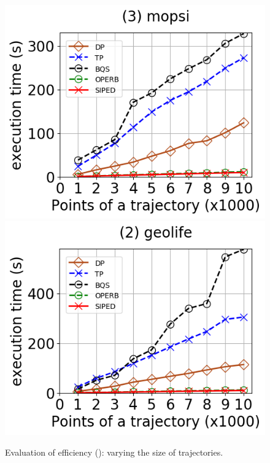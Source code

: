\begin{figure}[tb!]
	\includegraphics[scale=0.315]{Figures/Exp-PED-time-size-mopsi.png}	\hspace{1ex}
	\includegraphics[scale=0.315]{Figures/Exp-PED-time-size-geolife.png}	\hspace{1ex}
	\vspace{-2.5ex}
	\caption{\small Evaluation of efficiency (\ped): varying the size of trajectories.}\label{fig:time-size-ped}
	\vspace{-2ex}
\end{figure}

